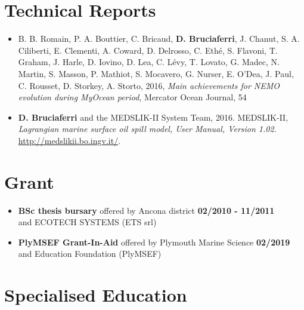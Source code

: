 \documentclass[a4paper, oneside, final]{scrartcl}
\begin{document}
\section{Technical Reports}
\noindent
\normalsize
\begin{itemize}
\item B. B. Romain, P. A. Bouttier, C. Bricaud, \textbf{D. Bruciaferri}, J. Chanut, S. A. Ciliberti, E. Clementi, A. Coward, D. Delrosso, C. Ethé, S. Flavoni, T. Graham, J. Harle, D. Iovino, D. Lea, C. Lévy, T. Lovato, G. Madec, N. Martin, S. Masson, P. Mathiot, S. Mocavero, G. Nurser, E. O’Dea, J. Paul, C. Rousset, D. Storkey, A. Storto, 2016, \textit{Main achievements for NEMO evolution during MyOcean period}, Mercator Ocean Journal, 54
\item \textbf{D. Bruciaferri} and the MEDSLIK-II System Team, 2016. MEDSLIK-II, \textit{Lagrangian marine surface oil spill model, User Manual, Version 1.02}. \url{http://medslikii.bo.ingv.it/}.\\
\end{itemize}
\section{Grant}
\noindent
\normalsize
\begin{itemize}
\item  \textbf{BSc thesis bursary} offered by Ancona district \hspace{3.cm} \textbf{02/2010 - 11/2011} \\
         and ECOTECH SYSTEMS (ETS srl)\\
\item  \textbf{PlyMSEF Grant-In-Aid} offered by Plymouth Marine Science \hspace{2.4cm} \textbf{02/2019} \\
         and Education Foundation (PlyMSEF)\\      
\end{itemize}
\pagebreak
\section{Specialised Education}
\noindent
\normalsize
\end{document}
